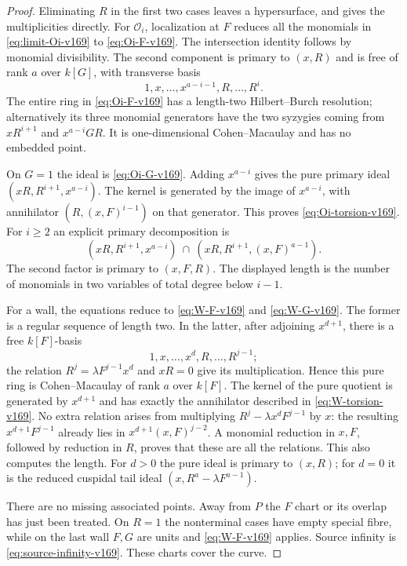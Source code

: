 \begin{proof}
Eliminating $R$ in the first two cases leaves a hypersurface, and gives
the multiplicities directly. For $\mathcal O_i$, localization at $F$
reduces all the monomials in \eqref{eq:limit-Oi-v169} to
\eqref{eq:Oi-F-v169}. The intersection identity follows by monomial
divisibility. The second component is primary to $(x,R)$ and is free
of rank $a$ over $k[G]$, with transverse basis
\[
 1,x,\ldots,x^{a-i-1},R,\ldots,R^i.
\]
The entire ring in \eqref{eq:Oi-F-v169} has a length-two
Hilbert--Burch resolution; alternatively its three monomial generators
have the two syzygies coming from $xR^{i+1}$ and $x^{a-i}GR$.
It is one-dimensional Cohen--Macaulay and has no embedded point.

On $G=1$ the ideal is \eqref{eq:Oi-G-v169}. Adding $x^{a-i}$ gives
the pure primary ideal $(xR,R^{i+1},x^{a-i})$. The kernel is generated
by the image of $x^{a-i}$, with annihilator
$(R,(x,F)^{i-1})$ on that generator. This proves
\eqref{eq:Oi-torsion-v169}. For $i\geq2$ an explicit primary
decomposition is
\[
 (xR,R^{i+1},x^{a-i})
 \ \cap\ (xR,R^{i+1},(x,F)^{a-1}).
\]
The second factor is primary to $(x,F,R)$. The displayed length is
the number of monomials in two variables of total degree below $i-1$.

For a wall, the equations reduce to \eqref{eq:W-F-v169} and
\eqref{eq:W-G-v169}. The former is a regular sequence of length two.
In the latter, after adjoining $x^{d+1}$, there is a free $k[F]$-basis
\[
 1,x,\ldots,x^d,R,\ldots,R^{j-1};
\]
the relation $R^j=\lambda F^{j-1}x^d$ and $xR=0$ give its
multiplication. Hence this pure ring is Cohen--Macaulay of rank $a$
over $k[F]$. The kernel of the pure quotient is generated by
$x^{d+1}$ and has exactly the annihilator described in
\eqref{eq:W-torsion-v169}. No extra relation arises from multiplying
$R^j-\lambda x^dF^{j-1}$ by $x$: the resulting
$x^{d+1}F^{j-1}$ already lies in $x^{d+1}(x,F)^{j-2}$.
A monomial reduction in $x,F$, followed by reduction in $R$, proves
that these are all the relations. This also computes the length.
For $d>0$ the pure ideal is primary to $(x,R)$; for $d=0$ it is the
reduced cuspidal tail ideal $(x,R^a-\lambda F^{a-1})$.

There are no missing associated points. Away from $P$ the $F$ chart
or its overlap has just been treated. On $R=1$ the nonterminal cases
have empty special fibre, while on the last wall $F,G$ are units and
\eqref{eq:W-F-v169} applies. Source infinity is
\eqref{eq:source-infinity-v169}. These charts cover the curve.
\end{proof}

